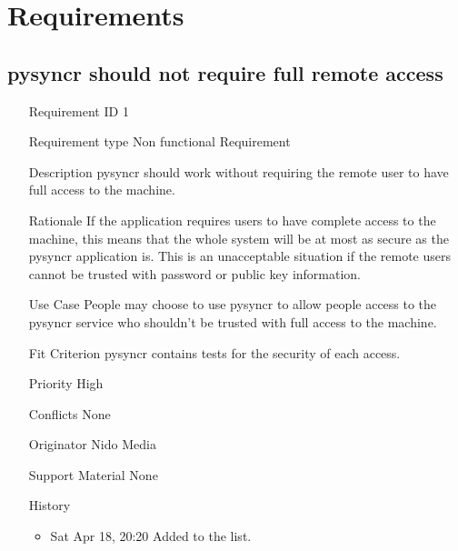 \documentclass{article}
\begin{document}
\section{Requirements}

  \subsection{pysyncr should not require full remote access}

    \begin{itemize}
      \item[Requirement ID] 1
      \item[Requirement type] Non functional Requirement
      \item[Description] pysyncr should work without requiring the
      remote user to have full access to the machine.
      \item[Rationale] If the application requires users to have
      complete access to the machine, this means that the whole system
      will be at most as secure as the pysyncr application is. This is
      an unacceptable situation if the remote users cannot be trusted
      with password or public key information.
      \item[Use Case] People may choose to use pysyncr to allow people
      access to the pysyncr service who shouldn't be trusted with full
      access to the machine.
      \item[Fit Criterion] pysyncr contains tests for the security of
      each access.
      \item[Priority] High
      \item[Conflicts] None
      \item[Originator] Nido Media
      \item[Support Material] None
      \item[History]
      \begin{itemize}
        \item Sat Apr 18, 20:20 Added to the list.
      \end{itemize}
    \end{itemize}
\end{document}
